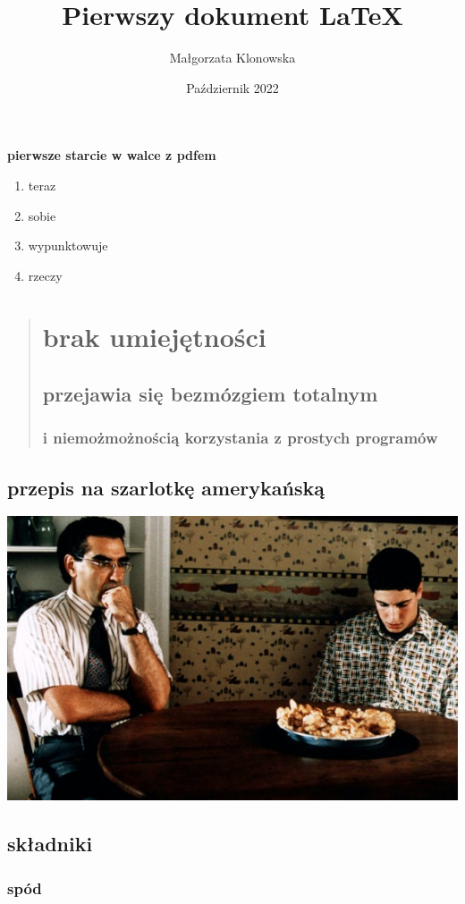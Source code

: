 \documentclass[16pt, letterpaper, titlepage]{article}
\title{Pierwszy dokument LaTeX}
\author{Małgorzata Klonowska}
\date{Październik 2022}
\begin{document}
\maketitle
\begin{huge}
\begin{center}
\textbf{pierwsze starcie w walce z pdfem}
\end{center}
\end{huge}
\newpage
\begin{LARGE}
\begin{enumerate}
\item teraz 
\item sobie
\item wypunktowuje
\item rzeczy
\end{enumerate}
\end{LARGE}
\newpage
\begin{quotation}
\section{brak umiejętności}
\subsection{przejawia się bezmózgiem totalnym}
\subsubsection{i niemożmożnością korzystania z prostych programów}
\end{quotation}
\newpage
\begin{center}
\begin{Huge}
\section*{przepis na szarlotkę amerykańską}
\includegraphics[scale=0.5]{szarlotka.jpg}
\end{Huge}
\begin{LARGE}
\subsection*{składniki}
\end{LARGE}
\subsubsection*{spód}
\end{center}
\end{document}
